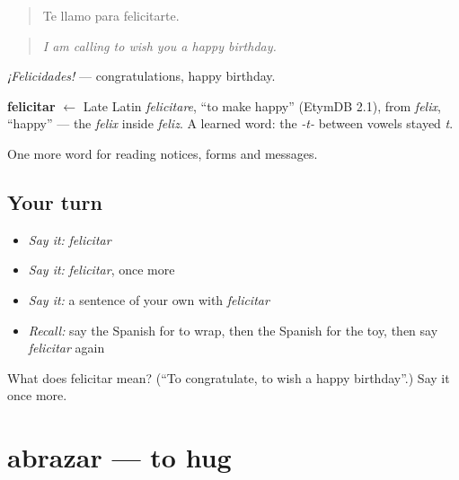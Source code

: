 \begin{quote}
Te llamo para felicitarte.
\end{quote}

\begin{quote}
\emph{I am calling to wish you a happy birthday.}
\end{quote}

\emph{¡Felicidades!} — congratulations, happy birthday.

\begin{cousinweb}
\textbf{felicitar} $\leftarrow$ Late Latin \emph{felicitare}, \textquotedblleft{}to make happy\textquotedblright{} (EtymDB 2.1), from \emph{felix}, \textquotedblleft{}happy\textquotedblright{} — the \emph{felix} inside \emph{feliz}. A learned word: the \emph{-t-} between vowels stayed \emph{t}.
\end{cousinweb}

\begin{grammarlens}[title={What you've built}]
One more word for reading notices, forms and messages.
\end{grammarlens}

\subsection*{Your turn}
\begin{itemize}
\raggedright
  \item \emph{Say it:} \emph{felicitar}
  \item \emph{Say it:} \emph{felicitar}, once more
  \item \emph{Say it:} a sentence of your own with \emph{felicitar}
  \item \emph{Recall:} say the Spanish for to wrap, then the Spanish for the toy, then say \emph{felicitar} again
\end{itemize}

\begin{tcolorbox}[breakable,colback=teal!4,colframe=teal!35!black,title={Before you move on}]
What does felicitar mean? (\textquotedblleft{}To congratulate, to wish a happy birthday\textquotedblright{}.) Say it once more.
\end{tcolorbox}
\section[abrazar]{abrazar — to hug}

\label{lesson:ES-C506-abrazar}



